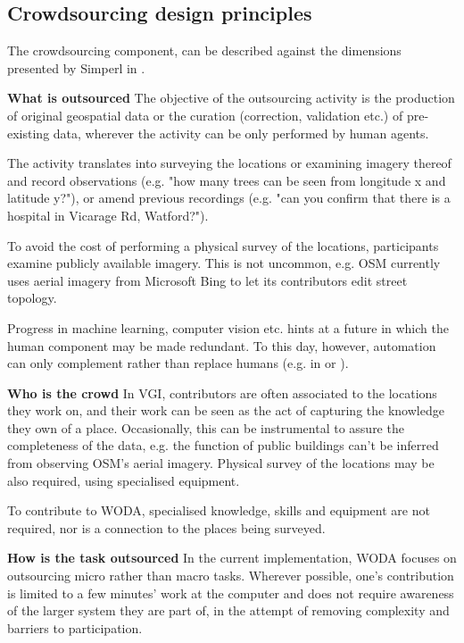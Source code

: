 \subsection{Crowdsourcing design principles}

The crowdsourcing component, can be described against the dimensions presented by Simperl in \cite{Simperl:2015ju}. 

\textbf{What is outsourced} The objective of the outsourcing activity is the production of original geospatial data or the curation (correction, validation etc.) of pre-existing data, wherever the activity can be only performed by human agents. 

The activity translates into surveying the locations or examining imagery thereof and record observations (e.g. "how many trees can be seen from longitude x and latitude y?"), or amend previous recordings (e.g. "can you confirm that there is a hospital in Vicarage Rd, Watford?"). 

To avoid the cost of performing a physical survey of the locations, participants examine publicly available imagery. This is not uncommon, e.g. OSM currently uses aerial imagery from Microsoft Bing to let its contributors edit street topology.

Progress in machine learning, computer vision etc. hints at a future in which the human component may be made redundant. To this day, however, automation can only complement rather than replace humans (e.g. in \cite{Goetz:1gd} or \cite{Schmid:2012we}).

\textbf{Who is the crowd} In VGI, contributors are often associated to the locations they work on, and their work can be seen as the act of capturing the knowledge they own of a place. Occasionally, this can be instrumental to assure the completeness of the data, e.g. the function of public buildings can't be inferred from observing OSM's aerial imagery. Physical survey of the locations may be also required, using specialised equipment.

To contribute to WODA, specialised knowledge, skills and equipment are not required, nor is a connection to the places being surveyed. 

\textbf{How is the task outsourced} In the current implementation, WODA focuses on outsourcing micro rather than macro tasks. Wherever possible, one's contribution is limited to a few minutes' work at the computer and does not require awareness of the larger system they are part of, in the attempt of removing complexity and barriers to participation.

